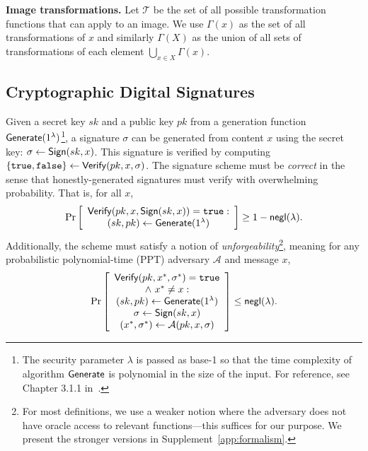 \documentclass[12pt]{article}
\begin{document}
\textbf{Image transformations.}
Let $\mathcal{T}$ be the set of all possible transformation functions that can apply to an image.
We use $\Gamma(x)$ as the set of all transformations of $x$ and similarly $\Gamma(X)$ as the union of all sets of transformations of each element $\bigcup_{x \in X} \Gamma(x)$.

\subsection{Cryptographic Digital Signatures}
Given a secret key $sk$ and a public key $pk$ from a generation function $\mathsf{Generate}(1^\lambda)$\footnote{The security parameter $\lambda$ is passed as base-1 so that the time complexity of algorithm $\mathsf{Generate}$ is polynomial in the size of the input. For reference, see Chapter 3.1.1 in~\citet{katzlindell}.}, a signature $\sigma$ can be generated from content $x$ using the secret key: $\sigma \gets \mathsf{Sign}(sk, x)$.
This signature is verified by computing $\{\mathtt{true},\mathtt{false}\} \gets \mathsf{Verify}(pk, x, \sigma)$.
The signature scheme must be \textit{correct} in the sense that honestly-generated signatures must verify with overwhelming probability. That is, for all $x$,
\begin{align*}
    \Pr\left[
    \begin{array}{ccc}
        \begin{matrix}
            \mathsf{Verify}(pk, x, \mathsf{Sign}(sk, x)) = \mathtt{true}: \\
            (sk, pk) \gets \mathsf{Generate}(1^\lambda) \\
        \end{matrix} \\
    \end{array}
    \right] \geq 1 - \mathsf{negl}(\lambda).
\end{align*}
Additionally, the scheme must satisfy a notion of \textit{unforgeability}\footnote{For most definitions, we use a weaker notion where the adversary does not have oracle access to relevant functions---this suffices for our purpose. We present the stronger versions in Supplement~\ref{app:formalism}.}, meaning for any probabilistic polynomial-time (PPT) adversary $\mathcal{A}$ and message $x$,
\begin{align*}
    \Pr\left[
    \begin{array}{ccc}
        \begin{matrix}
            \mathsf{Verify}(pk, x^*, \sigma^*) = \mathtt{true} \\
            \land\ x^* \neq x: \\
            (sk, pk) \gets \mathsf{Generate}(1^\lambda) \\
            \sigma \gets \mathsf{Sign}(sk, x) \\
            (x^*, \sigma^*) \gets \mathcal{A}(pk, x, \sigma) \\
        \end{matrix} \\
    \end{array}
    \right] \leq \mathsf{negl}(\lambda).
\end{align*}
\end{document}
